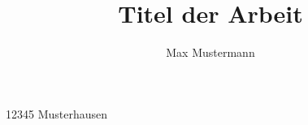 

\title{Titel der Arbeit}
\author{Max Mustermann}
\address{Musterstraße 1}{12345 Musterhausen}
\writemeta


	
\pagestyle{empty}

\maketitle
\newpage

\tableofcontents
\clearpage

\listoffigures
\clearpage

\pagestyle{fancy}
\fancyhead[R]{\sffamily\thepage}
\fancyhead[L]{\sffamily\nouppercase{\leftmark}}
\fancyfoot[C]{\thepage}




\clearpage

\fancyhead{\empty}
\renewcommand{\headrulewidth}{0pt}
\printbibliography
\clearpage


\clearpage


\clearpage


\clearpage


